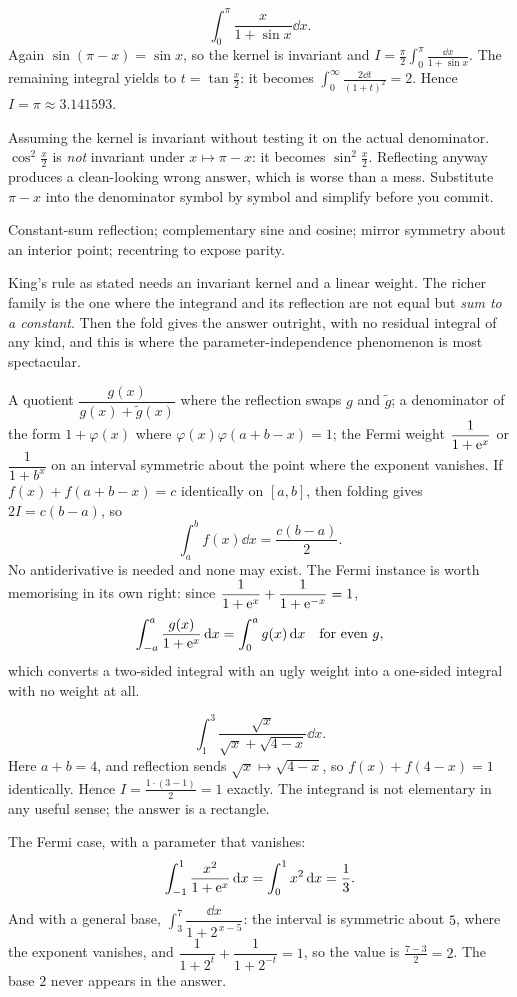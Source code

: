 \begin{worked}
\[\int_0^{\pi}\frac{x}{1+\sin x}\dd x.\]
Again $\sin(\pi-x)=\sin x$, so the kernel is invariant and $I=\tfrac{\pi}{2}\int_0^{\pi}\tfrac{\dd x}{1+\sin x}$. The remaining integral yields to $t=\tan\tfrac x2$: it becomes $\int_0^{\infty}\tfrac{2\dd t}{(1+t)^{2}}=2$. Hence $I=\pi\approx3.141593$.
\end{worked}

\begin{trap}
Assuming the kernel is invariant without testing it on the actual denominator. $\cos^{2}\tfrac{x}{2}$ is \emph{not} invariant under $x\mapsto\pi-x$: it becomes $\sin^{2}\tfrac x2$. Reflecting anyway produces a clean-looking wrong answer, which is worse than a mess. Substitute $\pi-x$ into the denominator symbol by symbol and simplify before you commit.
\end{trap}

\begin{seealsob}Constant-sum reflection; complementary sine and cosine; mirror symmetry about an interior point; recentring to expose parity.\end{seealsob}

King's rule as stated needs an invariant kernel and a linear weight. The richer family is the one where the integrand and its reflection are not equal but \emph{sum to a constant}. Then the fold gives the answer outright, with no residual integral of any kind, and this is where the parameter-independence phenomenon is most spectacular.

\cue A quotient $\dfrac{g(x)}{g(x)+\tilde g(x)}$ where the reflection swaps $g$ and $\tilde g$; a denominator of the form $1+\varphi(x)$ where $\varphi(x)\varphi(a+b-x)=1$; the Fermi weight $\dfrac{1}{1+\mathrm{e}^{x}}$ or $\dfrac{1}{1+b^{x}}$ on an interval symmetric about the point where the exponent vanishes.
\method If $f(x)+f(a+b-x)=c$ identically on $[a,b]$, then folding gives $2I=c(b-a)$, so
\[\int_a^bf(x)\dd x=\frac{c(b-a)}{2}.\]
No antiderivative is needed and none may exist. The Fermi instance is worth memorising in its own right: since $\dfrac{1}{1+\mathrm{e}^{x}}+\dfrac{1}{1+\mathrm{e}^{-x}}=1$,
\[\int_{-a}^{a}\frac{g(x)}{1+\mathrm{e}^{x}}\,\mathrm{d} x=\int_0^{a}g(x)\,\mathrm{d} x\quad\text{for even }g,\]
which converts a two-sided integral with an ugly weight into a one-sided integral with no weight at all.

\begin{worked}
\[\int_1^{3}\frac{\sqrt{x}}{\sqrt{x}+\sqrt{4-x}}\dd x.\]
Here $a+b=4$, and reflection sends $\sqrt x\mapsto\sqrt{4-x}$, so $f(x)+f(4-x)=1$ identically. Hence $I=\tfrac{1\cdot(3-1)}{2}=1$ exactly. The integrand is not elementary in any useful sense; the answer is a rectangle.

The Fermi case, with a parameter that vanishes:
\[\int_{-1}^{1}\frac{x^{2}}{1+\mathrm{e}^{x}}\,\mathrm{d} x=\int_0^{1}x^{2}\,\mathrm{d} x=\frac13.\]
And with a general base, $\int_3^{7}\dfrac{\dd x}{1+2^{\,x-5}}$: the interval is symmetric about $5$, where the exponent vanishes, and $\dfrac{1}{1+2^{t}}+\dfrac{1}{1+2^{-t}}=1$, so the value is $\tfrac{7-3}{2}=2$. The base $2$ never appears in the answer.
\end{worked}

